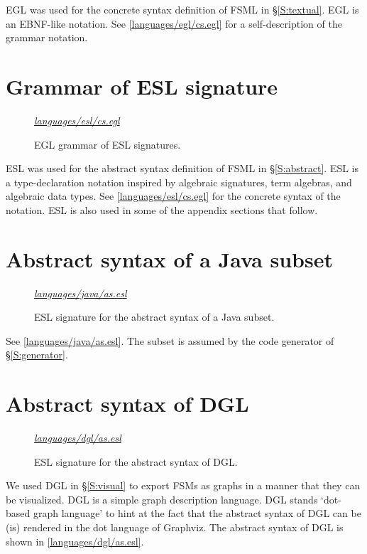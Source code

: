 \documentclass[preprint,authoryear,12pt]{noelsarticle}
\newcommand{\codefigure}[3]{
\begin{figure}[t!]
\begin{boxedminipage}{\hsize}
\mbox{}\hfill{}{\small\textit{\href{http://github.com/slebok/slepro/tree/master/#2}{#2}}}

\end{boxedminipage}
\caption{#1.}
\label{#2}
\medskip
\end{figure}}
\begin{document}
EGL was used for the concrete syntax definition of FSML in
\S\ref{S:textual}. EGL is an EBNF-like notation. See
\autoref{languages/egl/cs.egl} for a self-description of the grammar notation.


\pagebreak

\section{Grammar of ESL signature}
\label{A:esl}

\codefigure{%
EGL grammar of ESL signatures}{%
languages/esl/cs.egl}{%
esl}

ESL was used for the abstract syntax definition of FSML in
\S\ref{S:abstract}. ESL is a type-declaration notation inspired by
algebraic signatures, term algebras, and algebraic data types.  See
\autoref{languages/esl/cs.egl} for the concrete syntax of the
notation. ESL is also used in some of the appendix sections that follow.


\pagebreak

\section{Abstract syntax of a Java subset}
\label{A:java}

\codefigure{%
ESL signature for the abstract syntax of a Java subset}{%
languages/java/as.esl}{%
esl}

See \autoref{languages/java/as.esl}. The subset is assumed by the code
generator of \S\ref{S:generator}.


\pagebreak

\section{Abstract syntax of DGL}
\label{A:dgl}

\codefigure{%
ESL signature for the abstract syntax of DGL}{%
languages/dgl/as.esl}{%
esl}

We used DGL in \S\ref{S:visual} to export FSMs as graphs in a manner
that they can be visualized. DGL is a simple graph description
language. DGL stands `dot-based graph language' to hint at the fact
that the abstract syntax of DGL can be (is) rendered in the dot
language of Graphviz. The abstract syntax of DGL is shown in
\autoref{languages/dgl/as.esl}.
\end{document}
